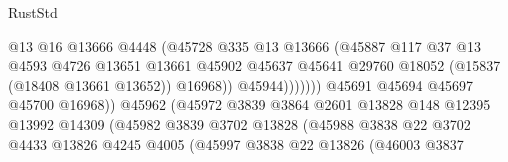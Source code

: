 \begin{lexlean}{RustStd}
\begin{coremodule}
                                              @13
                                              @16
                                              @13666
                                              @4448
                                              (@45728
                                                @335
                                                @13
                                                @13666
                                                (@45887
                                                  @117
                                                  @37
                                                  @13
                                                  @4593
                                                  @4726
                                                  @13651
                                                  @13661
                                                  @45902
                                                  @45637
                                                  @45641
                                                  @29760
                                                  @18052
                                                  (@15837 (@18408 @13661 @13652))
                                                  @16968))
                                              @45944)))))))
                                @45691
                                @45694
                                @45697
                                @45700
                                @16968))
                            @45962
                            (@45972
                              @3839
                              @3864
                              @2601
                              @13828
                              @148
                              @12395
                              @13992
                              @14309
                              (@45982
                                @3839
                                @3702
                                @13828
                                (@45988
                                  @3838
                                  @22
                                  @3702
                                  @4433
                                  @13826
                                  @4245
                                  @4005
                                  (@45997
                                    @3838
                                    @22
                                    @13826
                                    (@46003
                                      @3837

\end{coremodule}
\end{lexlean}
